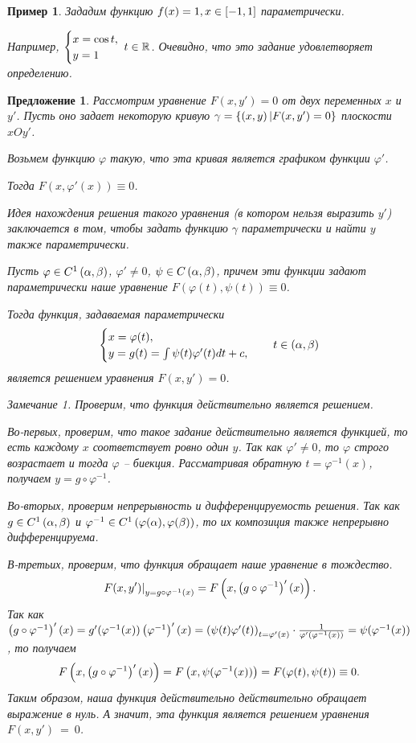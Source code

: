 \documentclass[a5paper, 10pt]{article}
\theoremstyle{definition}
\theoremstyle{plain}
\newtheorem*{Prop}{Предложение}
\newtheorem{Ex}{Пример}
\theoremstyle{remark}
\newtheorem*{Note}{Замечание}
\begin{document}
	\begin{Ex}
		Зададим функцию $f(x) = 1, x\in\left[-1,1\right]$ параметрически.
		
		Например, $\case{x =\cos t,\\ y=1} \; t\in \R$. Очевидно, что это задание удовлетворяет определению.
	\end{Ex}
	\begin{Prop}
		Рассмотрим уравнение $F(x,y') = 0$ от двух переменных $x$ и $y'$. Пусть оно задает некоторую кривую $\gamma = \left\{\left(x,y\right) | F(x,y') = 0\right\}$ плоскости $xOy'$.
		
		Возьмем функцию $\varphi$ такую, что эта кривая является графиком функции $\varphi'$. 
		
		Тогда $F(x, \varphi'(x)) \equiv 0$. 
		
		Идея нахождения решения такого уравнения (в котором нельзя выразить $y'$) заключается в том, чтобы задать функцию $\gamma$ параметрически и найти $y$ также параметрически.
		
		Пусть $\varphi \in C^1\left(\alpha,\beta\right)$, $\varphi' \neq 0$, $\psi\in C\left(\alpha, \beta\right)$, причем эти функции задают параметрически наше уравнение $F(\varphi(t), \psi(t)) \equiv 0$.
		
		Тогда функция, задаваемая параметрически 
		\[
		\begin{cases}
			x = \varphi(t),\\
			y = g(t) = \int \psi(t)\varphi'(t)dt + c,
		\end{cases}
		\quad t \in \left(\alpha, \beta\right)
		\]
		является решением уравнения $F(x, y')=0$.
		
		\begin{Note}
			Проверим, что функция действительно является решением.
			
			Во-первых, проверим, что такое задание действительно является функцией, то есть каждому $x$ соответствует ровно один $y$. Так как $\varphi'\neq 0$, то $\varphi$ строго возрастает и тогда $\varphi$ -- биекция. Рассматривая обратную $t=\varphi^{-1} (x)$, получаем $y=g \circ \varphi^{-1}$.  
			
			Во-вторых, проверим непрерывность и дифференцируемость решения. Так как $g \in C^{1}\left(\alpha, \beta\right)$ и $\varphi^{-1} \in C^{1}\left(\varphi(\alpha),\varphi(\beta)\right)$, то их композиция также непрерывно дифференцируема.
			
			В-третьих, проверим, что функция обращает наше уравнение в тождество.
			\[
			\left. F(x,y') \right|_{y=g\circ\varphi^{-1}(x)} = F\left(x, \left(g\circ \varphi^{-1}\right)'(x)\right).
			\]
			Так как $\left(g\circ \varphi^{-1}\right)'(x) = g'(\varphi^{-1}(x))\left(\varphi^{-1}\right)'(x) = \left(\psi(t)\varphi'(t)\right)_{t=\varphi'(x)} \cdot \frac{1}{\varphi'\left(\varphi^{-1}(x)\right)} = \psi(\varphi^{-1}(x))$, то получаем
			\[
			F\left(x, \left(g\circ \varphi^{-1}\right)'(x)\right) = F\left(x, \psi(\varphi^{-1}(x))\right) = F(\varphi(t), \psi(t)) \equiv 0.
			\]
			Таким образом, наша функция действительно действительно обращает выражение в нуль. А значит, эта функция является решением уравнения $F(x,y')~=~0$.
		\end{Note}
	\end{Prop}
\end{document}
